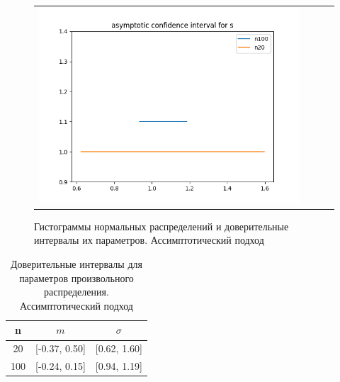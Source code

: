 \begin{figure}[H]
\begin{tabular}{cccc}
		\includegraphics[scale=0.3]{asymptotic_s.png}
	\end{tabular}
	\caption{Гистограммы нормальных распределений и доверительные интервалы их параметров. Ассимптотический подход}
\end{figure}

\begin{table}[H]
	\begin{center}
		\begin{tabular}{|c|c|c|}
			\hline 
			n & $m$ & $\sigma$ \\
			\hline \hline 
			20 & [-0.37, 0.50] & [0.62, 1.60] \\
			\hline 
			100 & [-0.24, 0.15] & [0.94, 1.19] \\
			\hline
		\end{tabular}
	\end{center}
	\caption{Доверительные интервалы для параметров произвольного распределения. Ассимптотический подход}
\end{table} 

